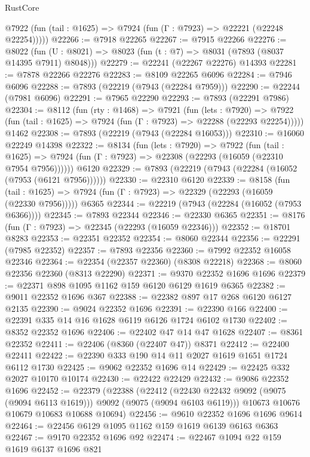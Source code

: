 \begin{lexlean}{RustCore}
\begin{coremodule}
      @7922 (fun (tail : @1625) => @7924 (fun (Γ : @7923) => @22221 (@22248 @22254)))))
@22266 := @7918 @22265
@22267 := @7915 @22266
@22276 := @8022
    (fun (U : @8021) => @8023 (fun (t : @7) => @8031 (@7893 (@8037 @14395 @7911) @8048)))
@22279 := @22241 (@22267 @22276) @14393
@22281 := @7878 @22266 @22276
@22283 := @8109 @22265 @6096
@22284 := @7946 @6096
@22288 := @7893 (@22219 (@7943 (@22284 @7959)))
@22290 := @22244 (@7981 @6096)
@22291 := @7965 @22290
@22293 := @7893 (@22291 @7986)
@22304 := @8112
    (fun (rty : @1468) =>
    @7921
      (fun (lets : @7920) =>
      @7922 (fun (tail : @1625) => @7924 (fun (Γ : @7923) => @22288 (@22293 @22254)))))
    @1462
@22308 := @7893 (@22219 (@7943 (@22284 @16053)))
@22310 := @16060 @22249 @14398
@22322 := @8134
    (fun (lets : @7920) =>
    @7922
      (fun (tail : @1625) =>
      @7924 (fun (Γ : @7923) => @22308 (@22293 (@16059 (@22310 @7954 @7956))))))
    @6120
@22329 := @7893 (@22219 (@7943 (@22284 (@16052 (@7953 (@6121 @7956))))))
@22330 := @22310 @6120
@22339 := @8158
    (fun (tail : @1625) => @7924 (fun (Γ : @7923) => @22329 (@22293 (@16059 (@22330 @7956)))))
    @6365
@22344 := @22219 (@7943 (@22284 (@16052 (@7953 @6366))))
@22345 := @7893 @22344
@22346 := @22330 @6365
@22351 := @8176 (fun (Γ : @7923) => @22345 (@22293 (@16059 @22346)))
@22352 := @18701 @8283
@22353 := @22351 @22352
@22354 := @8060 @22344
@22356 := @22291 (@7985 @22352)
@22357 := @7893 @22356
@22360 := @7992 @22352 @16058 @22346
@22364 := @22354 (@22357 @22360) (@8308 @22218)
@22368 := @8060 @22356 @22360 (@8313 @22290)
@22371 := @9370 @22352 @1696 @1696
@22379 := @22371 @898 @1095 @1162 @159 @6120 @6129 @1619 @6365
@22382 := @9011 @22352 @1696 @367
@22388 := @22382 @897 @17 @268 @6120 @6127 @2135
@22390 := @9024 @22352 @1696
@22391 := @22390 @166
@22400 := @22391 @335 @14 @16 @1628 @6119 @6126 @1724 @6102 @1730
@22402 := @8352 @22352 @1696
@22406 := @22402 @47 @14 @47 @1628
@22407 := @8361 @22352
@22411 := @22406 (@8360 (@22407 @47)) @8371
@22412 := @22400 @22411
@22422 := @22390 @333 @190 @14 @11 @2027 @1619 @1651 @1724 @6112 @1730
@22425 := @9062 @22352 @1696 @14
@22429 := @22425 @332 @2027 @10170 @10174
@22430 := @22422 @22429
@22432 := @9086 @22352 @1696
@22452 := @22379
    (@22388
      (@22412 (@22430 @22432 @9092 (@9075 (@9094 @6113 @1619))) @9092 (@9075 (@9094 @6103 @6119)))
      @10673
      @10676
      @10679
      @10683
      @10688
      @10694)
@22456 := @9610 @22352 @1696 @1696 @9614
@22464 := @22456 @6129 @1095 @1162 @159 @1619 @6139 @6163 @6363
@22467 := @9170 @22352 @1696 @92
@22474 := @22467 @1094 @22 @159 @1619 @6137 @1696 @821

\end{coremodule}
\end{lexlean}

